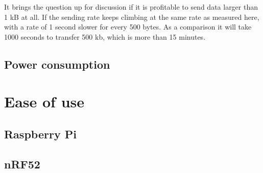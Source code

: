 It brings the question up for discussion if it is profitable to send data larger than 1 kB at all. If the sending rate keeps climbing at the same rate as measured here, with a rate of 1 second slower for every 500 bytes. As a comparison it will take 1000 seconds to transfer 500 kb, which is more than 15 minutes. 


\subsection{Power consumption}



\section{Ease of use}


\subsection{Raspberry Pi}



\subsection{nRF52}





